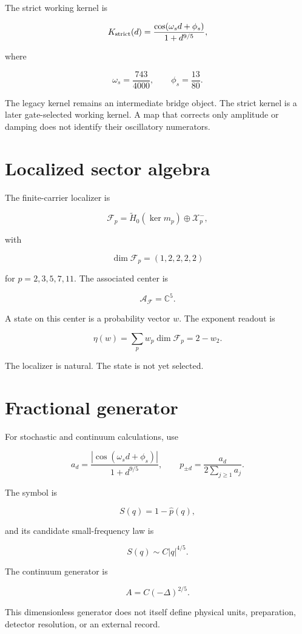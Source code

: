 \documentclass[11pt,a4paper,openany]{report}
\begin{document}
The strict working kernel is

\[
K_{\rm strict}(d)
=
\frac{\cos(\omega_sd+\phi_s)}
{1+d^{9/5}},
\]

where

\[
\omega_s=\frac{743}{4000},
\qquad
\phi_s=\frac{13}{80}.
\]

The legacy kernel remains an intermediate bridge object. The strict kernel is a later gate-selected working kernel. A map that corrects only amplitude or damping does not identify their oscillatory numerators.

\section{Localized sector algebra}

The finite-carrier localizer is

\[
\mathcal F_p
=
\widetilde H_0(\ker m_p)
\oplus\mathcal X_p^-,
\]

with

\[
\dim\mathcal F_p=(1,2,2,2,2)
\]

for \(p=2,3,5,7,11\). The associated center is

\[
\mathcal A_{\mathcal F}=\mathbb C^5.
\]

A state on this center is a probability vector \(w\). The exponent readout is

\[
\eta(w)=\sum_pw_p\dim\mathcal F_p=2-w_2.
\]

The localizer is natural. The state is not yet selected.

\section{Fractional generator}

For stochastic and continuum calculations, use

\[
a_d=
\frac{|\cos(\omega_sd+\phi_s)|}{1+d^{9/5}},
\qquad
p_{\pm d}=\frac{a_d}{2\sum_{j\ge1}a_j}.
\]

The symbol is

\[
S(q)=1-\widehat p(q),
\]

and its candidate small-frequency law is

\[
S(q)\sim C|q|^{4/5}.
\]

The continuum generator is

\[
A=C(-\Delta)^{2/5}.
\]

This dimensionless generator does not itself define physical units, preparation, detector resolution, or an external record.
\end{document}
